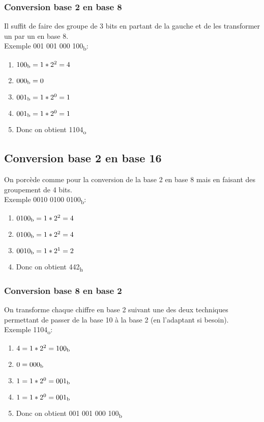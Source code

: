 \subsubsection{Conversion base 2 en base 8}
 Il suffit de faire des groupe de 3 bits en partant de la gauche et de les transformer un par un en base 8.\\
 Exemple 001 001 000 100\textsubscript{b}:

 \begin{enumerate}
	 \item $100\textsubscript{b} = 1*2^2 = 4$
	 \item $000\textsubscript{b} = 0$
	 \item $001\textsubscript{b} = 1*2^0 = 1$
	 \item $001\textsubscript{b} = 1*2^0 = 1$
	 \item Donc on obtient 1104\textsubscript{o}
 \end{enumerate}

 \subsection{Conversion base 2 en base 16}
 On porcède comme pour la conversion de la base 2 en base 8 mais en faisant des groupement de 4 bits.\\
 Exemple 0010 0100 0100\textsubscript{b}:
 \begin{enumerate}
	 \item $0100\textsubscript{b} = 1*2^2 = 4$
	 \item $0100\textsubscript{b} = 1*2^2 = 4$
	 \item $0010\textsubscript{b} = 1*2^1 = 2$
	 \item Donc on obtient 442\textsubscript{h}
 \end{enumerate}

 \subsubsection{Conversion base 8 en base 2}
 On transforme chaque chiffre en base 2 suivant une des deux techniques permettant de passer de la base 10 à la base 2 (en l'adaptant si besoin).\\
 Exemple 1104\textsubscript{o}:
 \begin{enumerate}
	 \item $4 = 1*2^2 = 100\textsubscript{b}$
	 \item $0 = 000\textsubscript{b}$
	 \item $1 = 1*2^0 = 001\textsubscript{b}$
	 \item $1 = 1*2^0 = 001\textsubscript{b}$
	 \item Donc on obtient 001 001 000 100\textsubscript{b}
 \end{enumerate}

